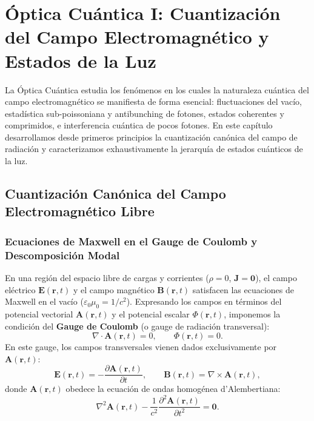 \documentclass[11pt,a4paper,twoside]{report}
\theoremstyle{definition}
\theoremstyle{plain}
\theoremstyle{remark}
\begin{document}
\chapter{Óptica Cuántica I: Cuantización del Campo Electromagnético y Estados de la Luz}

La Óptica Cuántica estudia los fenómenos en los cuales la naturaleza cuántica del campo electromagnético se manifiesta de forma esencial: fluctuaciones del vacío, estadística sub-poissoniana y antibunching de fotones, estados coherentes y comprimidos, e interferencia cuántica de pocos fotones. En este capítulo desarrollamos desde primeros principios la cuantización canónica del campo de radiación y caracterizamos exhaustivamente la jerarquía de estados cuánticos de la luz.

\section{Cuantización Canónica del Campo Electromagnético Libre}

\subsection{Ecuaciones de Maxwell en el Gauge de Coulomb y Descomposición Modal}

En una región del espacio libre de cargas y corrientes ($\rho = 0$, $\bm{J} = \bm{0}$), el campo eléctrico $\bm{E}(\bm{r},t)$ y el campo magnético $\bm{B}(\bm{r},t)$ satisfacen las ecuaciones de Maxwell en el vacío ($\varepsilon_0 \mu_0 = 1/c^2$). Expresando los campos en términos del potencial vectorial $\bm{A}(\bm{r},t)$ y el potencial escalar $\Phi(\bm{r},t)$, imponemos la condición del \textbf{Gauge de Coulomb} (o gauge de radiación transversal):
\begin{equation}
    \nabla \cdot \bm{A}(\bm{r},t) = 0, \qquad \Phi(\bm{r},t) = 0.
\end{equation}
En este gauge, los campos transversales vienen dados exclusivamente por $\bm{A}(\bm{r},t)$:
\begin{equation}
    \bm{E}(\bm{r},t) = -\frac{\partial \bm{A}(\bm{r},t)}{\partial t}, \qquad \bm{B}(\bm{r},t) = \nabla \times \bm{A}(\bm{r},t),
\end{equation}
donde $\bm{A}(\bm{r},t)$ obedece la ecuación de ondas homogénea d'Alembertiana:
\begin{equation}
    \nabla^2 \bm{A}(\bm{r},t) - \frac{1}{c^2}\frac{\partial^2 \bm{A}(\bm{r},t)}{\partial t^2} = \bm{0}.
\end{equation}
\end{document}
